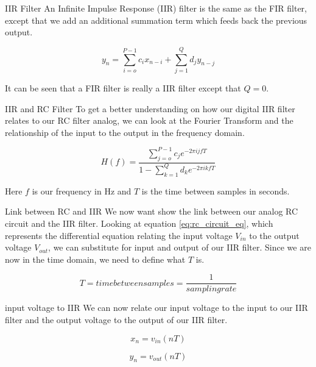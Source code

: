 \documentclass{beamer}
\begin{document}
\begin{frame}
\begin{block}{IIR Filter}
An Infinite Impulse Response (IIR) filter is the same as the FIR filter, except that we add an additional summation term which feeds back the previous output.

\begin{equation}\label{IIR_sum}
y_n=\displaystyle\sum\limits_{i=o}^{P-1} c_ix_{n-i}+\displaystyle\sum\limits_{j=1}^{Q} d_jy_{n-j}
\end{equation}

It can be seen that a FIR filter is really a IIR filter except that $Q=0$.  
\end{block}
\end{frame}

\begin{frame}
\begin{block}{IIR and RC Filter}
To get a better understanding on how our digital IIR filter relates to our RC filter analog, we can look at the Fourier Transform and the relationship of the input to the output in the frequency domain.

\begin{equation}\label{Fourier}
H(f)=\frac{\displaystyle\sum\limits_{j=o}^{P-1} c_je^{-2\pi ijfT}}{1-\displaystyle\sum\limits_{k=1}^{Q} d_ke^{-2\pi ikfT}}
\end{equation}

Here $f$ is our frequency in Hz and $T$ is the time between samples in seconds.
\end{block}
\end{frame}

\begin{frame}
\begin{block}{Link between RC and IIR}
We now want show the link between our analog RC circuit and the IIR filter.  Looking at equation \ref{eq:rc_circuit_eq}, which represents the differential equation relating the input voltage $V_{in}$ to the output voltage $V_{out}$, we can substitute for input and output of our IIR filter.  Since we are now in the time domain, we need to define what $T$ is.

\begin{equation}\label{Sample}
T=time between samples=\frac{1}{sampling rate}
\end{equation}
\end{block}
\end{frame}

\begin{frame}
\begin{block}{input voltage to IIR}
We can now relate our input voltage to the input to our IIR filter and the output voltage to the output of our IIR filter.

\begin{equation}\label{IIRxn}
x_n=v_{in}(nT)
\end{equation}

\begin{equation}\label{yn_out}
y_n=v_{out}(nT)
\end{equation}
\end{block}
\end{frame}
\end{document}
